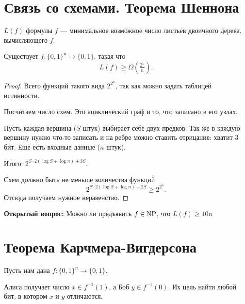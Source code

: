  

\section{Связь со схемами. Теорема Шеннона}
\begin{defn}
	 $ L(f)$ формулы  $ f$ --- минимальное возможное число листьев  двоичного дерева, вычисляющего  $ f$.
\end{defn}

\begin{thm}[Шеннон]
	Существует $ f \colon \{0, 1\}^{n} \to  \{0, 1\}$, такая что 
	$$ L(f) \ge \Omega\left( \tfrac{2^{n}}{n} \right) .$$
\end{thm}
\begin{proof}
    Всего функций такого вида $ 2^{2^{n}}$, так как можно задать таблицей истинности.

	Посчитаем число схем. Это ациклический граф и то, что записано в его узлах.

	Пусть каждая вершина ($ S$ штук) выбирает себе двух предков. Так же в каждую вершину нужно что-то записать и на ребре можно ставить отрицание: хватит $ 3$ бит. Еще есть входные данные ($ n$ штук).

	Итого: $2^{ S \cdot 2 (\log S + \log n) + 3S}$.

	Схем должно быть не меньше  количества функций
	\[
		2^{S \cdot  2( \log S + \log n) + 2 S} \ge  2^{2^n}
	.\] 
	Отсюда получаем нужное неравенство.
\end{proof}

\textbf{Открытый вопрос:} Можно ли предъявить $ f \in \operatorname{NP}$, что $ L(f) \ge  10n$

\section{Теорема Карчмера-Вигдерсона}

Пусть нам дана $ f\colon \{0, 1\}^{n } \to  \{0, 1\}$.

Алиса получает число $ x \in f^{-1}(1)$, а Боб $ y \in f^{-1}(0)$. Их цель найти любой бит, в котором $x$ и $y$ отличаются.

